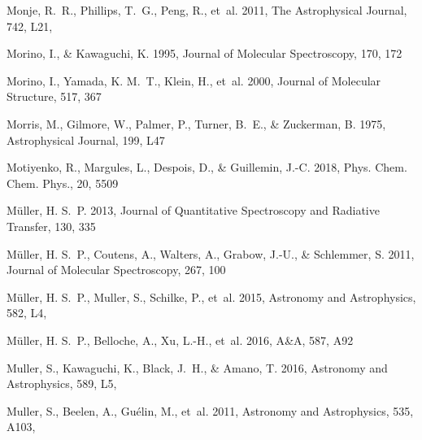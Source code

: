 \documentclass[twocolumn]{aastex631}
\begin{document}
\begin{thebibliography}{}
{Monje}, R.~R., {Phillips}, T.~G., {Peng}, R., {et~al.} 2011, The Astrophysical
  Journal, 742, L21, 

Morino, I., \& Kawaguchi, K. 1995, Journal of Molecular Spectroscopy, 170, 172

Morino, I., Yamada, K. M.~T., Klein, H., {et~al.} 2000, Journal of Molecular
  Structure, 517, 367

Morris, M., Gilmore, W., Palmer, P., Turner, B.~E., \& Zuckerman, B. 1975,
  Astrophysical Journal, 199, L47

Motiyenko, R., Margules, L., Despois, D., \& Guillemin, J.-C. 2018, Phys. Chem.
  Chem. Phys., 20, 5509

M{\"u}ller, H. S.~P. 2013, Journal of Quantitative Spectroscopy and Radiative
  Transfer, 130, 335

M{\"u}ller, H. S.~P., Coutens, A., Walters, A., Grabow, J.-U., \& Schlemmer, S.
  2011, Journal of Molecular Spectroscopy, 267, 100

{M{\"u}ller}, H. S.~P., {Muller}, S., {Schilke}, P., {et~al.} 2015, Astronomy
  and Astrophysics, 582, L4, 

M{\"u}ller, H. S.~P., Belloche, A., Xu, L.-H., {et~al.} 2016, A{\&}A, 587, A92

{Muller}, S., {Kawaguchi}, K., {Black}, J.~H., \& {Amano}, T. 2016, Astronomy
  and Astrophysics, 589, L5, 

{Muller}, S., {Beelen}, A., {Gu{\'e}lin}, M., {et~al.} 2011, Astronomy and
  Astrophysics, 535, A103, 


\end{thebibliography}
\end{document}
